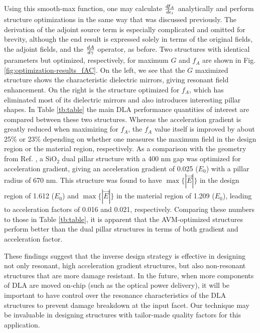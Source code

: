 Using this smooth-max function, one may calculate $\frac{d f_{A}}{d \epsilon_i}$ analytically and perform structure optimizations in the same way that was discussed previously.
The derivation of the adjoint source term is especially complicated and omitted for brevity, although the end result is expressed solely in terms of the original fields, the adjoint fields, and the $\frac{d A}{d \gamma}$ operator, as before.
Two structures with identical parameters but optimized, respectively, for maximum $G$ and $f_A$ are shown in Fig. \ref{fig:optimization-results_fAC}.
On the left, we see that the $G$ maximized structure shows the characteristic dielectric mirrors, giving resonant field enhancement.
On the right is the structure optimized for $f_A$, which has eliminated most of its dielectric mirrors and also introduces interesting pillar shapes.
In Table \ref{tb:table} the main DLA performance quantities of interest are compared between these two structures.
Whereas the acceleration gradient is greatly reduced when maximizing for $f_A$, the $f_A$ value itself is improved by about 25\% or 23\% depending on whether one measures the maximum field in the design region or the material region, respectively.
As a comparison with the geometry from Ref. \cite{leedle2015dielectric}, a SiO$_2$ dual pillar structure with a 400 nm gap was optimized for acceleration gradient, giving an acceleration gradient of 0.025 ($E_0$) with a pillar radius of 670 nm.
This structure was found to have $\max\{|\vec{E}|\}$ in the design region of 1.612 ($E_0$) and $\max\{|\vec{E}|\}$ in the material region of 1.209 ($E_0$), leading to acceleration factors of 0.016 and 0.021, respectively.
Comparing these numbers to those in Table \ref{tb:table}, it is apparent that the AVM-optimized structures perform better than the dual pillar structures in terms of both gradient and acceleration factor.

These findings suggest that the inverse design strategy is effective in designing not only resonant, high acceleration gradient structures, but also non-resonant structures that are more damage resistant.
In the future, when more components of DLA are moved on-chip (such as the optical power delivery), it will be important to have control over the resonance characteristics of the DLA structures to prevent damage breakdown at the input facet.
Our technique may be invaluable in designing structures with tailor-made quality factors for this application.


